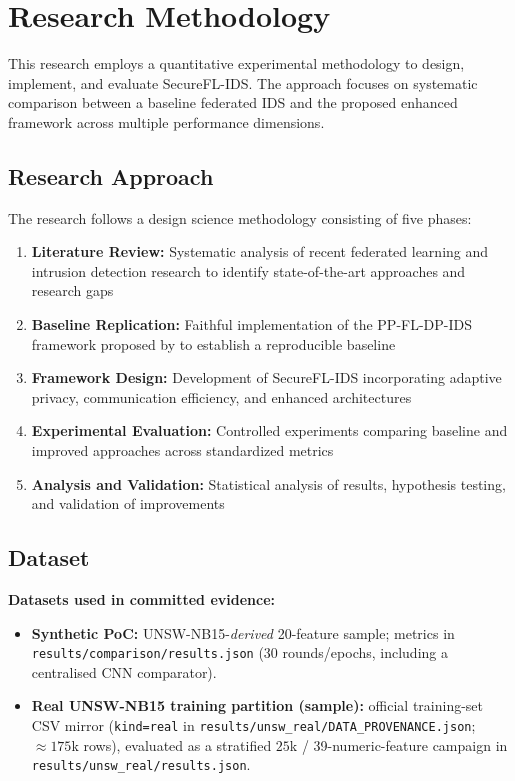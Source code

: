 \section{Research Methodology}
\label{sec:methodology}

This research employs a quantitative experimental methodology to design, implement, and evaluate SecureFL-IDS. The approach focuses on systematic comparison between a baseline federated IDS and the proposed enhanced framework across multiple performance dimensions.

\subsection{Research Approach}

The research follows a design science methodology consisting of five phases:

\begin{enumerate}
    \item \textbf{Literature Review:} Systematic analysis of recent federated learning and intrusion detection research to identify state-of-the-art approaches and research gaps
    
    \item \textbf{Baseline Replication:} Faithful implementation of the PP-FL-DP-IDS framework proposed by \citet{saklani2026privacy} to establish a reproducible baseline
    
    \item \textbf{Framework Design:} Development of SecureFL-IDS incorporating adaptive privacy, communication efficiency, and enhanced architectures
    
    \item \textbf{Experimental Evaluation:} Controlled experiments comparing baseline and improved approaches across standardized metrics
    
    \item \textbf{Analysis and Validation:} Statistical analysis of results, hypothesis testing, and validation of improvements
\end{enumerate}

\subsection{Dataset}

\textbf{Datasets used in committed evidence:}
\begin{itemize}
    \item \textbf{Synthetic PoC:} UNSW-NB15-\emph{derived} 20-feature sample; metrics in \texttt{results/comparison/results.json} (30 rounds/epochs, including a centralised CNN comparator).
    \item \textbf{Real UNSW-NB15 training partition (sample):} official training-set CSV mirror (\texttt{kind=real} in \texttt{results/unsw\_real/DATA\_PROVENANCE.json}; $\approx 175$k rows), evaluated as a stratified $25$k / 39-numeric-feature campaign in \texttt{results/unsw\_real/results.json}.
\end{itemize}

